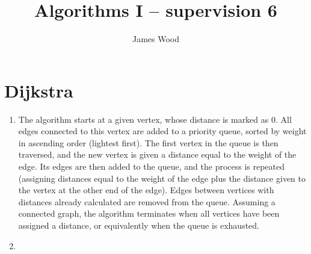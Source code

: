 \documentclass[11pt]{article}
\title{\textbf{Algorithms I -- supervision 6}}
\author{James Wood}
\begin{document}
\renewcommand{\labelenumi}{(\alph{enumi})}
\renewcommand{\labelenumii}{(\roman{enumii})}

\maketitle

\section{Dijkstra}
\begin{enumerate}
\item The algorithm starts at a given vertex, whose distance is marked as 0. All edges connected to this vertex are added to a priority queue, sorted by weight in ascending order (lightest first). The first vertex in the queue is then traversed, and the new vertex is given a distance equal to the weight of the edge. Its edges are then added to the queue, and the process is repeated (assigning distances equal to the weight of the edge plus the distance given to the vertex at the other end of the edge). Edges between vertices with distances already calculated are removed from the queue. Assuming a connected graph, the algorithm terminates when all vertices have been assigned a distance, or equivalently when the queue is exhausted.
\item
\end{enumerate}
\end{document}
